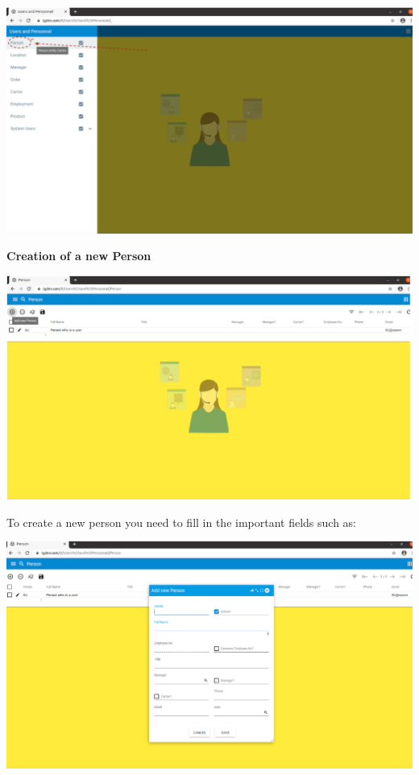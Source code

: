 \includegraphics[width=\textwidth]{sections/01-chapter/images/person1.png}

\textbf{Creation of a new Person}

\includegraphics[width=\textwidth]{sections/01-chapter/images/person2.png}

To create a new person you need to  fill in the important fields such as:

\includegraphics[width=\textwidth]{sections/01-chapter/images/person3.png}

